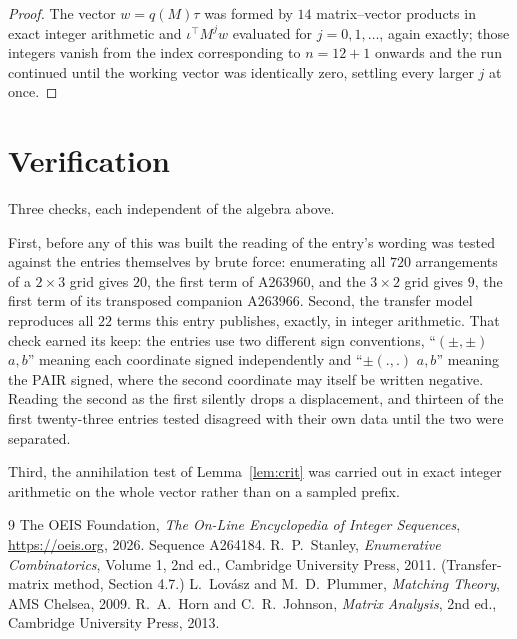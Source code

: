 \documentclass[11pt,a4paper]{article}
\theoremstyle{plain}
\theoremstyle{definition}
\begin{document}
\begin{proof}
The vector $w=q(M)\tau$ was formed by $14$ matrix--vector products in exact integer
arithmetic and $\iota^{\!\top}M^{j}w$ evaluated for $j=0,1,\dots$, again exactly; those
integers vanish from the index corresponding to $n=12+1$ onwards and the run continued
until the working vector was identically zero, settling every larger $j$ at once.
\end{proof}

\section{Verification}

Three checks, each independent of the algebra above.

First, before any of this was built the reading of the entry's wording was tested against the
entries themselves by brute force: enumerating all $720$ arrangements of a $2\times3$ grid
gives $20$, the first term of A263960, and the $3\times2$ grid gives $9$, the first term of its
transposed companion A263966. Second, the transfer model reproduces all $22$ terms this
entry publishes, exactly, in integer arithmetic. That check earned its keep: the entries use
two different sign conventions, ``$(\pm,\pm)$ $a,b$'' meaning each coordinate signed
independently and ``$\pm(.,.)$ $a,b$'' meaning the PAIR signed, where the second coordinate may
itself be written negative. Reading the second as the first silently drops a displacement, and
thirteen of the first twenty-three entries tested disagreed with their own data until the two
were separated.

Third, the annihilation test of Lemma~\ref{lem:crit} was carried out in exact integer
arithmetic on the whole vector rather than on a sampled prefix.

\begin{thebibliography}{9}
 The OEIS Foundation, \emph{The On-Line Encyclopedia of Integer
Sequences}, \url{https://oeis.org}, 2026. Sequence A264184.
 R.~P.~Stanley, \emph{Enumerative Combinatorics}, Volume 1, 2nd ed.,
Cambridge University Press, 2011. (Transfer-matrix method, Section 4.7.)
 L.~Lov\'asz and M.~D.~Plummer, \emph{Matching Theory}, AMS Chelsea, 2009.
 R.~A.~Horn and C.~R.~Johnson, \emph{Matrix Analysis}, 2nd ed., Cambridge
University Press, 2013.
\end{thebibliography}
\end{document}
